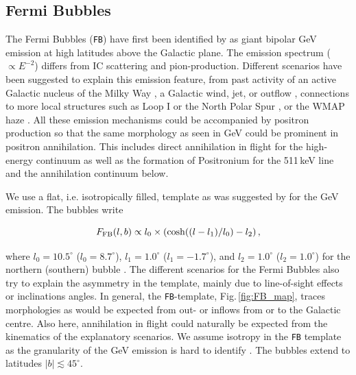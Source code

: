 \documentclass[doublespace,nopageskip]{VTthesis} %
\newcommand{\mrm}[1]{\mathrm{#1}}
\begin{document}
\begin{appendices}
	
	\subsection{Fermi Bubbles}
	
	The Fermi Bubbles (\texttt{FB}) have first been identified by \citet{Su2010_fermibubbles} as giant bipolar GeV emission at high latitudes above the Galactic plane.
	The emission spectrum ($\propto E^{-2}$) differs from IC scattering and pion-production.
	Different scenarios have been suggested to explain this emission feature, from past activity of an active Galactic nucleus of the Milky Way \citep{Su2010_fermibubbles,Zubovas2012_FermiBubbles_AGN,Guo2012_FermiBubbles_AGN,Yang2017_FermiBubbles_AGN}, a Galactic wind, jet, or outflow \citep{Crocker2012_FermiBubbles_outflows,Sarkar2015_FermiBubbles_outflows,Lacki2014_FermiBubbles_outflows}, connections to more local structures such as Loop I or the North Polar Spur \citep{Kataoka2013_FermiBubbles_local,Sofue2015_NPS_Aquila_FermiBubbles,Ackermann2014_FermiBubbles}, or the WMAP haze \citep{Dobler2012_FermiBubbles_WMAPHaze,Ackermann2014_FermiBubbles,Crocker2015_FermiBubbles_WMAPHaze}.
	All these emission mechanisms could be accompanied by positron production so that the same morphology as seen in GeV could be prominent in positron annihilation.
	This includes direct annihilation in flight for the high-energy continuum as well as the formation of Positronium for the 511\,keV line and the annihilation continuum below.
	
	We use a flat, i.e. isotropically filled, template as was suggested by \citet{Macias2018_LATGeV} for the GeV emission.
	The bubbles write
	
	\begin{equation}
		F_{\rm FB}(l,b) \propto l_0 \times \left( \cosh((l-l_1)/l_0) - l_2 \right)\mrm{,}
		\label{eq:FB_formula}
	\end{equation}
	
	\noindent where $l_0 = 10.5^{\circ}$ ($l_0 = 8.7^{\circ}$), $l_1 = 1.0^{\circ}$ ($l_1 = -1.7^{\circ}$), and $l_2 = 1.0^{\circ}$ ($l_2 = 1.0^{\circ}$) for the northern (southern) bubble \citep{Acero2016_FermiLAT_sources}.
	The different scenarios for the Fermi Bubbles also try to explain the asymmetry in the template, mainly due to line-of-sight effects or inclinations angles.
	In general, the \texttt{FB}-template, Fig.\,\ref{fig:FB_map}, traces morphologies as would be expected from out- or inflows from or to the Galactic centre.
	Also here, annihilation in flight could naturally be expected from the kinematics of the explanatory scenarios.
	We assume isotropy in the \texttt{FB} template as the granularity of the GeV emission is hard to identify \citep{Ackermann2014_FermiBubbles}.
	The bubbles extend to latitudes $|b| \lesssim 45^{\circ}$.
	

\end{appendices}
\end{document}
